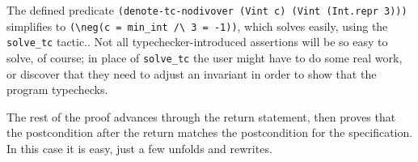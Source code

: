 \documentclass{puthesis}
\begin{document}

The defined predicate \lstinline|(denote-tc-nodivover (Vint c) (Vint (Int.repr 3)))|
simplifies to \lstinline|(\neg(c = min_int /\ 3 = -1))|,
which solves easily, using the \lstinline|solve_tc| tactic..
Not all typechecker-introduced assertions will be so easy
to solve, of course; in place of \lstinline|solve_tc|
the user might have to do some real work, or discover that they need
to adjust an invariant in order to show that the program typechecks.

The rest of the proof advances through the return statement, then proves that
the postcondition after the return matches the postcondition for the 
specification. In this case it is easy, just a few unfolds and rewrites.
\end{document}
